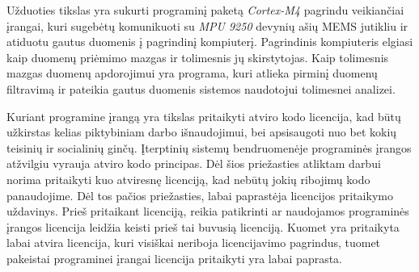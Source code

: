 Užduoties tikslas yra sukurti programinį paketą \textit{Cortex-M4} pagrindu veikiančiai įrangai, kuri sugebėtų komunikuoti su \textit{MPU 9250} devynių ašių MEMS jutikliu ir atiduotu gautus duomenis į pagrindinį kompiuterį.
Pagrindinis kompiuteris elgiasi kaip duomenų priėmimo mazgas ir tolimesnis jų skirstytojas.
Kaip tolimesnis mazgas duomenų apdorojimui yra programa, kuri atlieka pirminį duomenų filtravimą ir pateikia gautus duomenis sistemos naudotojui tolimesnei analizei.

Kuriant programine įrangą yra tikslas pritaikyti atviro kodo licencija, kad būtų užkirstas kelias piktybiniam darbo išnaudojimui, bei apsisaugoti nuo bet kokių teisinių ir socialinių ginčų.
Įterptinių sistemų bendruomenėje programinės įrangos atžvilgiu vyrauja atviro kodo principas.
Dėl šios priežasties atliktam darbui norima pritaikyti kuo atviresnę licenciją, kad nebūtų jokių ribojimų kodo panaudojime.
Dėl tos pačios priežasties, labai paprastėja licencijos pritaikymo uždavinys.
Prieš pritaikant licenciją, reikia patikrinti ar naudojamos programinės įrangos licencija leidžia keisti prieš tai buvusią licenciją.
Kuomet yra pritaikyta labai atvira licencija, kuri visiškai neriboja licencijavimo pagrindus, tuomet pakeistai programinei įrangai licencija pritaikyti yra labai paprasta. 